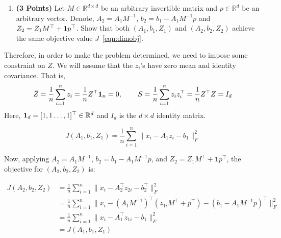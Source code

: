 \documentclass[a4paper]{article}
\newcommand*{\one}{{\bf 1}}
\newcommand{\Zbar}{\bar{Z}}
\theoremstyle{definition}
\newcommand{\RR}{\mathbb{R}}
\newenvironment{soln}{
    \leavevmode\color{blue}\ignorespaces
}{}
\begin{document}
\begin{enumerate}
\item \textbf{(3 Points)}
Let $M\in\RR^{d\times d}$ be an arbitrary invertible matrix and $p\in\RR^{d}$ be an arbitrary vector.
Denote, $A_2 = A_1M^{-1}$, $b_2 = b_1- A_1M^{-1}p$ and $Z_2 = Z_1 M^\top +
\one p^\top$.
Show that both
$(A_1, b_1, Z_1)$ and $(A_2, b_2, Z_2)$ achieve the same objective value $J$~\eqref{eqn:dimobj}.
\end{enumerate}

Therefore, in order to make the problem determined, we need to impose some
constraint on $Z$. We will assume that the $z_i$'s have zero mean and identity covariance.
That is,
\begin{align*}
\Zbar = \frac{1}{n} \sum_{i=1}^n z_i =\frac{1}{n} Z^\top {\bf 1}_n = 0, \hspace{0.3in} 
S = \frac{1}{n} \sum_{i=1}^n z_i z_i^\top 
= \frac{1}{n} Z^\top Z
= I_d
\end{align*}
Here, ${\bf 1}_d = [1, 1 \dots, 1]^\top \in\RR^d$ and $I_d$  is the $d\times d$ identity matrix.

\begin{soln}

    \[ J(A_1,b_1,Z_1) = \frac{1}{n} \sum_{i=1}^n \|x_i - A_1z_i - b_1\|^2_F \]
    
    Now, applying \( A_2 = A_1M^{-1} \), \( b_2 = b_1 - A_1M^{-1}p \), and \( Z_2 = Z_1 M^\top + \mathbf{1}p^\top \), the objective for \( (A_2, b_2, Z_2) \) is:
    
    \begin{align*}
    J(A_2,b_2,Z_2) &= \frac{1}{n} \sum_{i=1}^n \|x_i - A_2^\top z_{2i} - b_2^\top\|^2_F \\
    &= \frac{1}{n} \sum_{i=1}^n \|x_i - (A_1M^{-1})^\top(z_{1i}M^\top + p^\top) - (b_1 - A_1M^{-1}p)^\top\|^2_F \\
    &= \frac{1}{n} \sum_{i=1}^n \|x_i - A_1^\top z_{1i} - b_1\|^2_F \\
    &= J(A_1,b_1,Z_1)
    \end{align*}
    
\end{soln}
\end{document}
